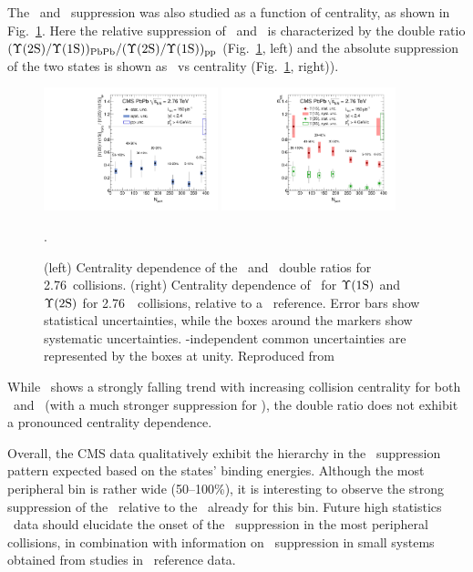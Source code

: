 The \PgUa\ and \PgUb\ suppression was also studied as a function of centrality,
as shown in Fig.~\ref{fig:GR:centrality}.
Here the relative suppression of \PgUa\ and \PgUb\ is characterized by
the double ratio \linebreak $({\Upsilon\mathrm{(2S)}/\Upsilon\mathrm{(1S)}})_{\rm PbPb}/({\Upsilon\mathrm{(2S)}/\Upsilon\mathrm{(1S)}})_{\rm pp}$
(Fig.~\ref{fig:GR:centrality}, left) and the absolute suppression
of the two states is shown as \Raa\ vs centrality (Fig.~\ref{fig:GR:centrality}, right)).

\begin{figure}[t]
\begin{center}
   \includegraphics[width=0.45\textwidth]{qqbarfigures/chi2VsCent}
   \includegraphics[width=0.45\textwidth]{qqbarfigures/RaaPt4}
  \caption{(left) Centrality dependence of the \PgUa\ and \PgUb\ double ratios
for 2.76\TeV\ collisions.  (right) Centrality dependence of \Raa\ 
for $\Upsilon\mathrm{(1S)}$ and $\Upsilon\mathrm{(2S)}$ for 2.76\TeV\ \PbPb\ collisions, relative to a \pp\ reference.
Error bars show statistical uncertainties, while the boxes around the markers
show systematic uncertainties. \npart-independent
common uncertainties are represented by the boxes at unity. Reproduced from~\cite{Chatrchyan:2012lxa}}.
\label{fig:GR:centrality}
\end{center}
\end{figure}

While \Raa\ shows a strongly falling trend with increasing collision centrality
for both \PgUa\ and \PgUb\ (with a much stronger suppression for \PgUb), the
double ratio does not exhibit a pronounced centrality dependence.

Overall, the CMS data qualitatively exhibit the hierarchy in the \PgUn\ suppression pattern
expected based on the states' binding energies. Although the most peripheral bin
is rather wide (50--100\%), it is interesting to observe the strong suppression of the
\PgUb\ relative to the \PgUa\ already for this bin. Future high statistics \PbPb\ data
should elucidate the onset of the \PgU\ suppression in the most peripheral collisions,
in combination with information on \PgU\ suppression in small systems obtained from
studies in \pPb\ reference data.

